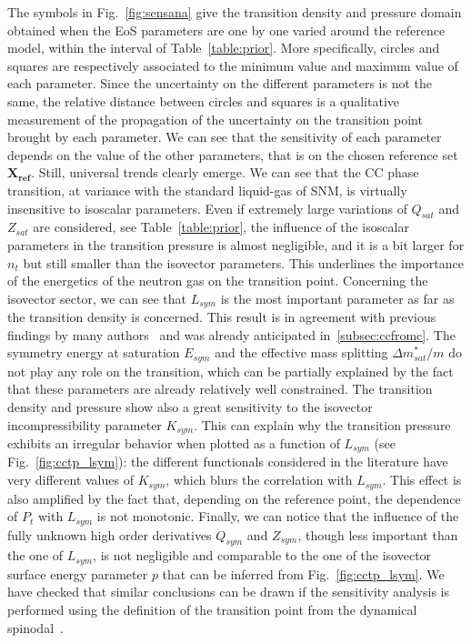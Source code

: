 The symbols in Fig.~\ref{fig:sensana} give the transition density and 
pressure domain obtained when the EoS parameters are one by one varied around 
the reference model, within the interval of Table~\ref{table:prior}. More
specifically, circles and squares are respectively associated to the minimum
value and maximum value of each parameter.
Since the uncertainty on the different parameters is not the same, the 
relative distance between circles and squares is a qualitative measurement of 
the propagation of the uncertainty on the transition point brought by each 
parameter. We can see that the sensitivity of each parameter depends on the 
value of the other parameters, that is on the chosen reference set 
$\bm{X_{ref}}$. Still, universal trends clearly emerge. We can see that the CC 
phase transition, at variance with the 
standard liquid-gas of SNM, is virtually insensitive to isoscalar parameters. 
Even if extremely large variations of $Q_{sat}$ and $Z_{sat}$ are considered, 
see Table~\ref{table:prior}, the influence of the isoscalar parameters in the 
transition pressure is almost negligible, and it is a bit larger for $n_t$ but 
still smaller than the isovector parameters. This underlines the importance of 
the energetics of the neutron gas on the transition point. Concerning the 
isovector sector, we can see that $L_{sym}$ is the most important 
parameter as far as the transition density is concerned. This result is in 
agreement with previous findings by many authors~\cite{Ducoin2011} and was
already anticipated in~\ref{subsec:ccfromc}.
The symmetry energy at saturation $E_{sym}$ and the effective mass splitting
$\Delta m_{sat}^*/m$ do not play any role on the transition, which can be 
partially explained by the fact that these parameters are already relatively 
well constrained. The transition density and pressure show also a great 
sensitivity to the isovector incompressibility parameter $K_{sym}$. 
This can explain why the transition pressure exhibits an irregular behavior 
when plotted as a function of $L_{sym}$ (see Fig.~\ref{fig:cctp_lsym}): the 
different functionals considered in the literature have very different values 
of $K_{sym}$, which blurs the correlation with $L_{sym}$. This effect is also 
amplified by the fact that, depending on the reference point, the dependence of 
$P_t$ with $L_{sym}$ is not monotonic. Finally, we can notice that the 
influence of the fully unknown high order derivatives $Q_{sym}$ and $Z_{sym}$, 
though less important than the one of $L_{sym}$, is not negligible and 
comparable to the one of the isovector surface energy parameter $p$ that can be 
inferred from Fig.~\ref{fig:cctp_lsym}. We have checked that similar 
conclusions can be drawn if the sensitivity analysis is performed using the 
definition of the transition point from the dynamical 
spinodal~\cite{Antic2019}.

